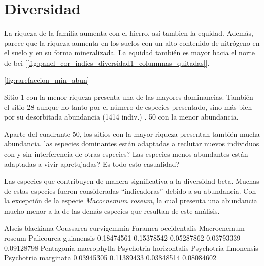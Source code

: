\documentclass[11pt,]{article}
\begin{document}
\section{Diversidad}\label{diversidad}

La riqueza de la familia aumenta con el hierro, así tambien la equidad.
Además, parece que la riqueza aumenta en los suelos con un alto
contenido de nitrógeno en el suelo y en su forma mineralizada. La
equidad también es mayor hacia el norte de bci
{[}\ref{fig:panel_cor_indics_diversidad1_columnnas_quitadas}{]}.

 \ref{fig:rarefaccion_min_abun}

Sitio 1 con la menor riqueza presenta una de las mayores dominancias.
También el sitio 28 aunque no tanto por el número de especies
presentado, sino más bien por su desorbitada abundancia (1414 indiv.) .
50 con la menor abundancia.

Aparte del cuadrante 50, los sitios con la mayor riqueza presentan
también mucha abundancia. las especies dominantes están adaptadas a
reclutar nuevos individuos con y sin interferencia de otras especies?
Las especies menos abundantes están adaptadas a vivir apretujadas? Es
todo esto casualidad?

Las especies que contribuyen de manera significativa a la diversidad
beta. Muchas de estas especies fueron consideradas ``indicadoras''
debido a su abundancia. Con la excepción de la especie \emph{Macocnemum
roseum}, la cual presenta una abundancia mucho menor a la de las demás
especies que resultan de este análisis.

Alseis blackiana Coussarea curvigemmia Faramea occidentalis Macrocnemum
roseum Palicourea guianensis 0.18474561 0.15378542 0.05287862 0.03793339
0.09128798 Pentagonia macrophylla Psychotria horizontalis Psychotria
limonensis Psychotria marginata 0.03945305 0.11389433 0.03848514
0.08084602
\end{document}
